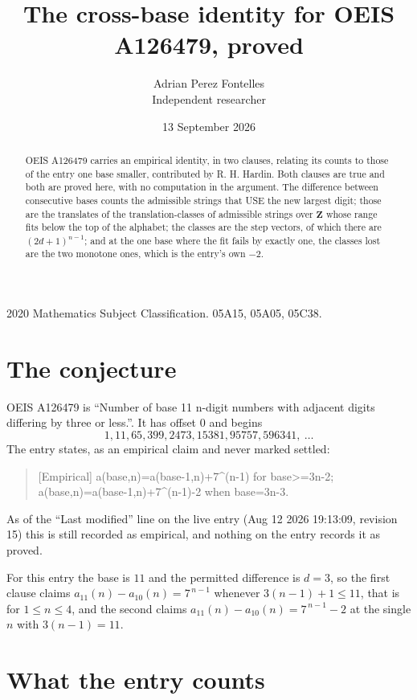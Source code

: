 \documentclass[11pt,a4paper]{article}
\title{The cross-base identity for OEIS A126479, proved}
\author{Adrian Perez Fontelles\\ \small Independent researcher}
\date{13 September 2026}
\theoremstyle{plain}
\theoremstyle{definition}
\begin{document}
\maketitle

\begin{abstract}
OEIS A126479 carries an empirical identity, in two clauses, relating its counts to those of the
entry one base smaller, contributed by R. H. Hardin. Both clauses are true and both are proved
here, with no computation in the argument. The difference between consecutive bases counts the
admissible strings that USE the new largest digit; those are the translates of the
translation-classes of admissible strings over $\mathbf{Z}$ whose range fits below the top of
the alphabet; the classes are the step vectors, of which there are $(2d+1)^{n-1}$; and at the
one base where the fit fails by exactly one, the classes lost are the two monotone ones, which
is the entry's own $-2$.
\end{abstract}

\noindent\small 2020 Mathematics Subject Classification. 05A15, 05A05, 05C38.\normalsize

\section{The conjecture}

OEIS A126479 is ``Number of base 11 n-digit numbers with adjacent digits differing by three or less.''. It has offset $0$ and begins
\[
1, 11, 65, 399, 2473, 15381, 95757, 596341,\ \dots
\]
The entry states, as an empirical claim and never marked settled:
\begin{quote}
[Empirical] a(base,n)=a(base-1,n)+7\textasciicircum{}(n-1) for base>=3n-2; a(base,n)=a(base-1,n)+7\textasciicircum{}(n-1)-2 when base=3n-3.
\end{quote}
As of the ``Last modified'' line on the live entry (Aug 12 2026 19:13:09, revision 15)
this is still recorded as empirical, and nothing on the entry records it as proved.

For this entry the base is $11$ and the permitted difference is $d=3$, so the first clause
claims $a_{11}(n)-a_{10}(n)=7^{\,n-1}$ whenever $3(n-1)+1\le11$, that is for
$1\le n\le4$, and the second claims $a_{11}(n)-a_{10}(n)=7^{\,n-1}-2$ at the single
$n$ with $3(n-1)=11$.

\section{What the entry counts}
\end{document}
